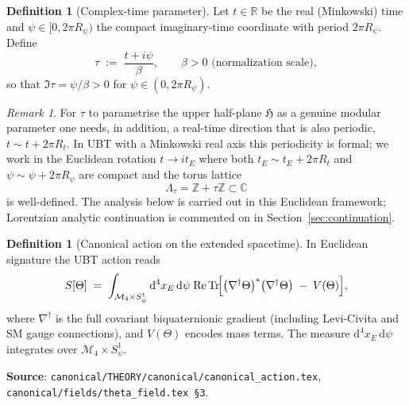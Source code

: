 \documentclass[12pt,a4paper]{article}
\theoremstyle{definition}
\newtheorem{definition}[theorem]{Definition}
\theoremstyle{remark}
\newtheorem{remark}[theorem]{Remark}
\newcommand{\ZZ}{\mathbb{Z}}
\newcommand{\HH}{\mathfrak{H}}
\newcommand{\RR}{\mathbb{R}}
\newcommand{\CC}{\mathbb{C}}
\newcommand{\dd}{\mathrm{d}}
\newcommand{\Tr}{\mathrm{Tr}}
\newcommand{\Real}{\mathrm{Re}}
\begin{document}
\begin{definition}[Complex-time parameter]
\label{def:tau}
Let $t\in\RR$ be the real (Minkowski) time and $\psi\in[0,2\pi R_\psi)$ the
compact imaginary-time coordinate with period $2\pi R_\psi$.  Define
\begin{equation}
  \tau \;:=\; \frac{t + i\psi}{\beta},
  \qquad \beta > 0 \text{ (normalization scale)},
  \label{eq:tau-def}
\end{equation}
so that $\Im\tau = \psi/\beta > 0$ for $\psi\in(0,2\pi R_\psi)$.
\end{definition}

\begin{remark}
For $\tau$ to parametrise the upper half-plane $\HH$ as a genuine modular
parameter one needs, in addition, a real-time direction that is also periodic,
$t\sim t+2\pi R_t$.  In UBT with a Minkowski real axis this periodicity is
formal; we work in the Euclidean rotation $t\to i t_E$ where both
$t_E\sim t_E+2\pi R_t$ and $\psi\sim\psi+2\pi R_\psi$ are compact and the
torus lattice
\begin{equation}
  \Lambda_\tau = \ZZ + \tau\ZZ \subset\CC
  \label{eq:lattice}
\end{equation}
is well-defined.  The analysis below is carried out in this Euclidean
framework; Lorentzian analytic continuation is commented on in
Section~\ref{sec:continuation}.
\end{remark}

\begin{definition}[Canonical action on the extended spacetime]
\label{def:action}
In Euclidean signature the UBT action reads
\begin{equation}
  S[\Theta]
  \;=\;
  \int_{\mathcal M_4\times S^1_\psi}
    \dd^4x_E\,\dd\psi\;
    \Real\,\Tr\!\Bigl[
      \bigl(\nabla^\dagger\Theta\bigr)^\ast\bigl(\nabla^\dagger\Theta\bigr)
      \;-\;
      V(\Theta)
    \Bigr],
  \label{eq:action}
\end{equation}
where $\nabla^\dagger$ is the full covariant biquaternionic gradient (including
Levi-Civita and SM gauge connections), and $V(\Theta)$ encodes mass terms.
The measure $\dd^4x_E\,\dd\psi$ integrates over $\mathcal M_4\times S^1_\psi$.

\medskip\noindent
\textbf{Source}: \texttt{canonical/THEORY/canonical/canonical\_action.tex},
\texttt{canonical/fields/theta\_field.tex \S3}.
\end{definition}

\end{document}
